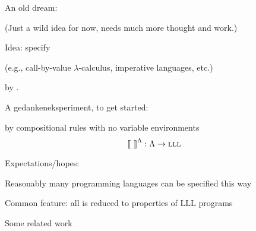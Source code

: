 \documentclass[12pt,fleqn,landscape]{article}
\begin{document}
\begin{slide}{An old dream: \\
 }

(Just a wild idea for now, needs much more thought and work.)
\vair\vair

Idea: specify 
\vair

\hfill (e.g., call-by-value $\lambda$-calculus, imperative languages, etc.) 
\vair

by . 
\vair\vair

A gedankeneksperiment, to get started: 
\vair\vair

by compositional rules with no variable environments
$$
\mbox{$\lbrack\hspace{-0.3ex}\lbrack$}\ \mbox{$\rbrack\hspace{-0.3ex}\rbrack$}^\Lambda : \Lambda \to \mbox{\sc lll}
$$
\smallskip

Expectations/hopes:
\bi

\item Reasonably many  programming languages can be specified this way


\item Common feature: all is reduced to properties of LLL programs

 

\ei





\end{slide}




\begin{slide}{Some related work}

\vspace{-25mm}


\nocite{*}

\end{slide}

\end{document}
